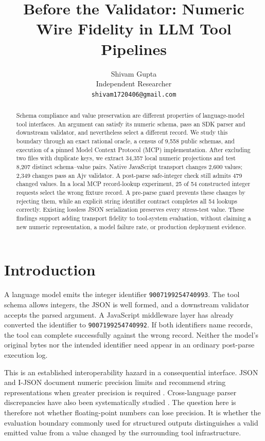 \documentclass[11pt]{article}
\title{Before the Validator: Numeric Wire Fidelity in LLM Tool Pipelines}
\author{Shivam Gupta \\
 Independent Researcher \\
 \texttt{shivam1720406@gmail.com}}
\begin{document}
\maketitle
\begin{abstract}
Schema compliance and value preservation are different properties of language-model tool interfaces. An argument can satisfy its numeric schema, pass an SDK parser and downstream validator, and nevertheless select a different record. We study this boundary through an exact rational oracle, a census of 9,558 public schemas, and execution of a pinned Model Context Protocol (MCP) implementation. After excluding two files with duplicate keys, we extract 34,357 local numeric projections and test 8,207 distinct schema--value pairs. Native JavaScript transport changes 2,600 values; 2,349 changes pass an Ajv validator. A post-parse safe-integer check still admits 479 changed values. In a local MCP record-lookup experiment, 25 of 54 constructed integer requests select the wrong fixture record. A pre-parse guard prevents these changes by rejecting them, while an explicit string identifier contract completes all 54 lookups correctly. Existing lossless JSON serialization preserves every stress-test value. These findings support adding transport fidelity to tool-system evaluation, without claiming a new numeric representation, a model failure rate, or production deployment evidence.
\end{abstract}

\section{Introduction}
A language model emits the integer identifier \texttt{9007199254740993}. The tool schema allows integers, the JSON is well formed, and a downstream validator accepts the parsed argument. A JavaScript middleware layer has already converted the identifier to \texttt{9007199254740992}. If both identifiers name records, the tool can complete successfully against the wrong record. Neither the model's original bytes nor the intended identifier need appear in an ordinary post-parse execution log.

This is an established interoperability hazard in a consequential interface. JSON and I-JSON document numeric precision limits and recommend string representations when greater precision is required \citep{bray2017,bray2015}. Cross-language parser discrepancies have also been systematically studied \citep{moeller2024}. The question here is therefore not whether floating-point numbers can lose precision. It is whether the evaluation boundary commonly used for structured outputs distinguishes a valid emitted value from a value changed by the surrounding tool infrastructure.
\end{document}
